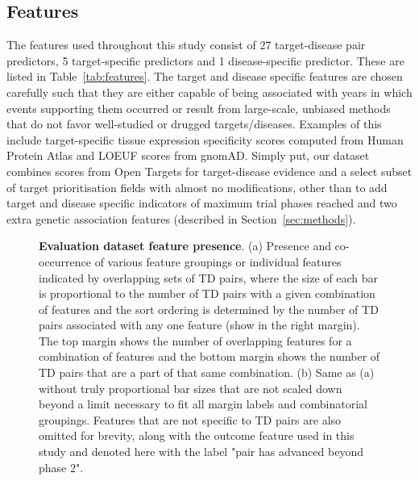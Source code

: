 \documentclass{article}
\begin{document}
\subsection{Features}
\label{sec:features}

The features used throughout this study consist of 27 target-disease pair predictors, 5 target-specific predictors and 1 disease-specific predictor. These are listed in Table~\ref{tab:features}. The target and disease specific features are chosen carefully such that they are either capable of being associated with years in which events supporting them occurred or result from large-scale, unbiased methods that do not favor well-studied or drugged targets/diseases. Examples of this include target-specific tissue expression specificity scores computed from Human Protein Atlas \cite{PMID:25613900} and LOEUF \cite{PMID:32461654} scores from gnomAD. Simply put, our dataset combines scores from Open Targets for target-disease evidence and a select subset of target prioritisation \cite{OT23.12release} fields with almost no modifications, other than to add target and disease specific indicators of maximum trial phases reached and two extra genetic association features (described in Section~\ref{sec:methods}).

\begin{figure}[!htb]
  \centering
  \captionsetup{width=.9\linewidth}
  \captionsetup[subfigure]{labelformat=empty}
  \qquad
  \caption{
    \textbf{Evaluation dataset feature presence}.
    (a) Presence and co-occurrence of various feature groupings or individual features indicated by overlapping sets of TD pairs, where the size of each bar is proportional to the number of TD pairs with a given combination of features and the sort ordering is determined by the number of TD pairs associated with any one feature (show in the right margin). The top margin shows the number of overlapping features for a combination of features and the bottom margin shows the number of TD pairs that are a part of that same combination.
    (b) Same as (a) without truly proportional bar sizes that are not scaled down beyond a limit necessary to fit all margin labels and combinatorial groupings. Features that are not specific to TD pairs are also omitted for brevity, along with the outcome feature used in this study and denoted here with the label "pair has advanced beyond phase 2".
  }
  \label{fig:feature_presence}
\end{figure}
\end{document}
